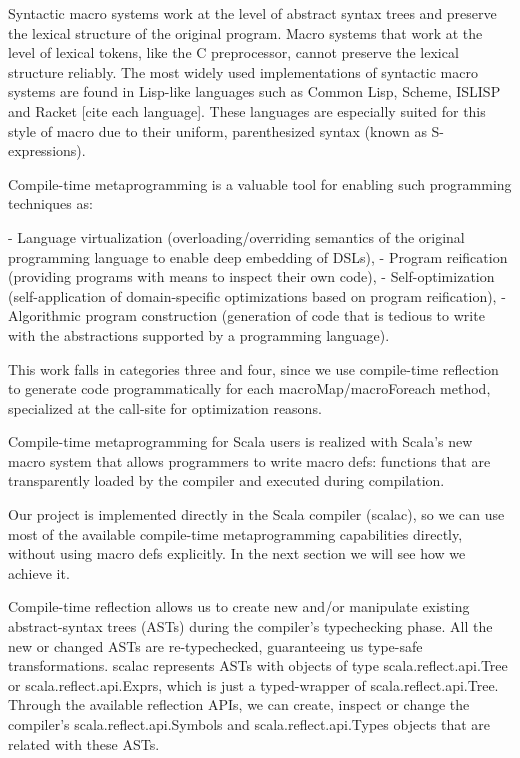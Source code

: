 Syntactic macro systems work at the level of abstract syntax trees and preserve
the lexical structure of the original program. Macro systems that work at the
level of lexical tokens, like the C preprocessor, cannot preserve the
lexical structure reliably. The most widely used implementations of syntactic
macro systems are found in Lisp-like languages such as Common Lisp, Scheme,
ISLISP and Racket [cite each language]. These languages are especially suited
for this style of macro due to their uniform, parenthesized syntax (known as
S-expressions).

Compile-time metaprogramming is a valuable tool for enabling such programming
techniques as:

- Language virtualization (overloading/overriding semantics of the original
programming language to enable deep embedding of DSLs),
- Program reification (providing programs with means to inspect their own code),
- Self-optimization (self-application of domain-specific optimizations based on
program reification),
- Algorithmic program construction (generation of code that is tedious to write
with the abstractions supported by a programming language).

This work falls in categories three and four, since we use compile-time
reflection to generate code programmatically for each macroMap/macroForeach
method, specialized at the call-site for optimization reasons.

 Compile-time metaprogramming for Scala users is realized with Scala's new
macro system that allows programmers to write macro defs: functions that
are transparently loaded by the compiler and executed during compilation.

Our project is implemented directly in the Scala compiler (scalac), so we can
use most of the available compile-time metaprogramming capabilities directly,
without using macro defs explicitly. In the next section we will see how we
achieve it.

Compile-time reflection allows us to create new and/or manipulate
existing abstract-syntax trees (ASTs) during the compiler's typechecking phase.
All the new or changed ASTs are re-typechecked, guaranteeing us type-safe
transformations. scalac represents ASTs with objects of type
scala.reflect.api.Tree or scala.reflect.api.Exprs, which is just a typed-wrapper
of scala.reflect.api.Tree. Through the available reflection APIs, we can create,
inspect or change the compiler's scala.reflect.api.Symbols and
scala.reflect.api.Types objects that are related with these ASTs.

